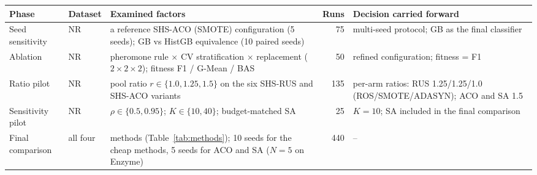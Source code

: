 \begin{tabular}{>{\raggedright\arraybackslash}p{23mm}>{\raggedright\arraybackslash}p{12mm}>{\raggedright\arraybackslash}p{52mm}r>{\raggedright\arraybackslash}p{40mm}}
\toprule
Phase & Dataset & Examined factors & Runs & Decision carried forward \\
\midrule
Seed sensitivity & NR &
  a reference SHS-ACO (SMOTE) configuration (5 seeds); GB vs HistGB
  equivalence (10 paired seeds) & 75 &
  multi-seed protocol; GB as the final classifier \\
\addlinespace[2pt]
Ablation & NR &
  pheromone rule $\times$ CV stratification $\times$ replacement
  ($2\times2\times2$); fitness F1 / G-Mean / BAS & 50 &
  refined configuration; fitness = F1 \\
\addlinespace[2pt]
Ratio pilot & NR &
  pool ratio $r \in \{1.0, 1.25, 1.5\}$ on the six SHS-RUS and SHS-ACO
  variants & 135 &
  per-arm ratios: RUS 1.25/1.25/1.0 (ROS/SMOTE/ADASYN); ACO and SA 1.5 \\
\addlinespace[2pt]
Sensitivity pilot & NR &
  $\rho \in \{0.5, 0.95\}$; $K \in \{10, 40\}$; budget-matched SA & 25 &
  $K = 10$; SA included in the final comparison \\
\addlinespace[2pt]
Final comparison & all four &
  13 methods (Table~\ref{tab:methods}); 10 seeds for the cheap methods,
  5 seeds for ACO and SA ($N = 5$ on Enzyme) & 440 & -- \\
\bottomrule
\end{tabular}
